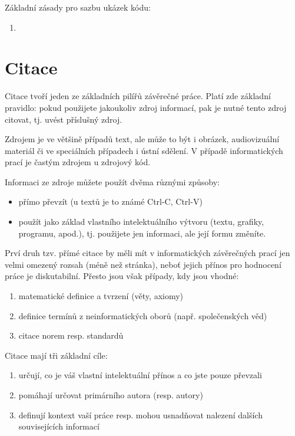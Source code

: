 \documentclass[male,czech,api_bc]{kitheses}
\begin{document}
Základní zásady pro sazbu ukázek kódu:

\begin{enumerate}
\item 
\end{enumerate}

\chapter{Citace}

Citace tvoří jeden ze základních pilířů závěrečné práce. Platí zde základní pravidlo: pokud použijete 
jakoukoliv zdroj informací, pak je nutné tento zdroj citovat, tj. uvést příslušný zdroj.

Zdrojem je ve většině případů text, ale může to být i obrázek, audiovizuální materiál či ve speciálních případech i ústní sdělení. V případě informatických prací je častým zdrojem u zdrojový kód.

Informaci ze zdroje můžete použít dvěma různými způsoby:

\begin{itemize}
\item přímo převzít (u textů je to známé Ctrl-C, Ctrl-V)
\item použít jako základ vlastního intelektuálního výtvoru (textu, grafiky, programu, apod.), tj. použijete jen informaci, ale její formu změníte.
\end{itemize}

Prví druh tzv. přímé citace by měli mít v informatických závěrečných prací jen velmi omezený rozsah (méně než stránka), neboť jejich přínos pro hodnocení práce je diskutabilní. Přesto jsou však případy, kdy jsou vhodné:

\begin{enumerate}
\item matematické definice a tvrzení (věty, axiomy)
\item definice termínů z neinformatických oborů (např. společenských věd)
\item citace norem resp. standardů
\end{enumerate} 

Citace mají tři základní cíle:
\begin{enumerate}
\item určují, co je váš vlastní intelektuální přínos a co jste pouze převzali
\item pomáhají určovat primárního autora (resp. autory)
\item definují kontext vaší práce resp. mohou usnadňovat nalezení dalších souvisejících informací
\end{enumerate}
\end{document}
